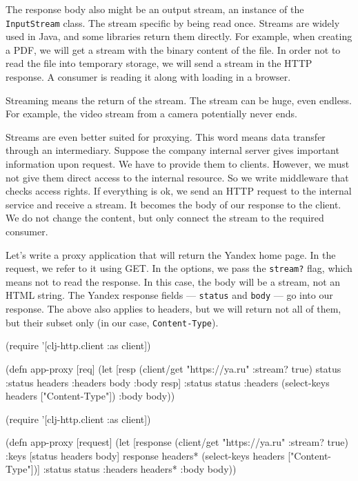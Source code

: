 The response body also might be an output stream, an instance of the \verb|InputStream| class. The stream specific by being read once. Streams are widely used in Java, and some libraries return them directly. For example, when creating a PDF, we will get a stream with the binary content of the file. In order not to read the file into temporary storage, we will send a stream in the HTTP response. A consumer is reading it along with loading in a browser.

Streaming means the return of the stream. The stream can be huge, even endless. For example, the video stream from a camera potentially never ends.

Streams are even better suited for proxying. This word means data transfer through an intermediary. Suppose the company internal server gives important information upon request. We have to provide them to clients. However, we must not give them direct access to the internal resource. So we write middleware that checks access rights. If everything is ok, we send an HTTP request to the internal service and receive a stream. It becomes the body of our response to the client. We do not change the content, but only connect the stream to the required consumer.

Let's write a proxy application that will return the Yandex home page. In the request, we refer to it using GET. In the options, we pass the \verb|stream?| flag, which means not to read the response. In this case, the body will be a stream, not an HTML string. The Yandex response fields — \verb|status| and \verb|body| — go into our response. The above also applies to headers, but we will return not all of them, but their subset only (in our case, \verb|Content-Type|).

\ifx\DEVICETYPE\MOBILE

\begin{clojure}
(require '[clj-http.client :as client])

(defn app-proxy [req]
  (let [resp (client/get "https://ya.ru"
                         {:stream? true})
        {status :status
         headers :headers
         body :body} resp]
    {:status status
     :headers (select-keys
                headers ["Content-Type"])
     :body body}))
\end{clojure}

\else

\begin{clojure}
(require '[clj-http.client :as client])

(defn app-proxy [request]
  (let [response (client/get "https://ya.ru" {:stream? true})
        {:keys [status headers body]} response
        headers* (select-keys headers ["Content-Type"])]
    {:status status
     :headers headers*
     :body body}))
\end{clojure}

